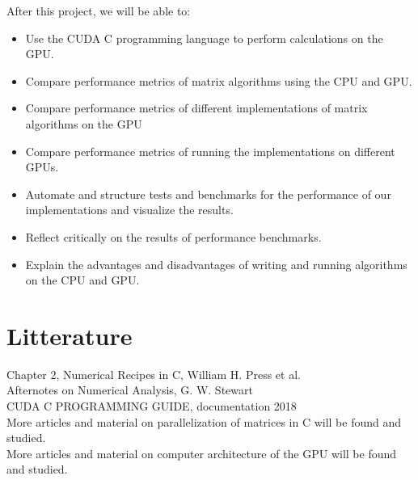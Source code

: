 After this project, we will be able to:

\begin{itemize}
    \item Use the CUDA C programming language to perform calculations on the GPU.
    \item Compare performance metrics of matrix algorithms using the CPU and GPU.
    \item Compare performance metrics of different implementations of matrix algorithms on the GPU
    \item Compare performance metrics of running the implementations on different GPUs.
    \item Automate and structure tests and benchmarks for the performance of our implementations and visualize the results.
    \item Reflect critically on the results of performance benchmarks.
    \item Explain the advantages and disadvantages of writing and running algorithms on the CPU and GPU.
\end{itemize}


\section*{Litterature}
Chapter 2, Numerical Recipes in C, William H. Press et al.\\
Afternotes on Numerical Analysis, G. W. Stewart\\
CUDA C PROGRAMMING GUIDE, documentation 2018\\
More articles and material on parallelization of matrices in C will be found and studied.\\
More articles and material on computer architecture of the GPU will be found and studied.\\